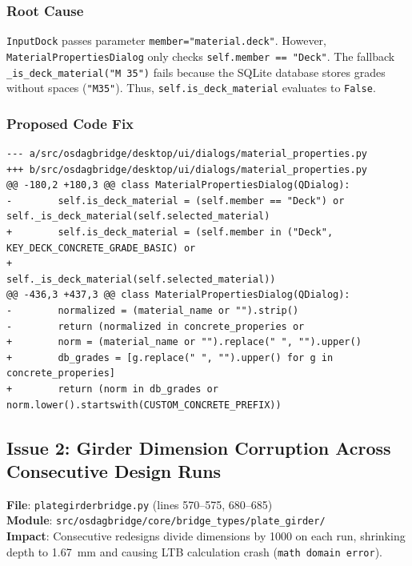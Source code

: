 \documentclass[11pt,a4paper]{article}
\begin{document}
\subsubsection*{Root Cause}
\texttt{InputDock} passes parameter \texttt{member="material.deck"}. However, \texttt{MaterialPropertiesDialog} only checks \texttt{self.member == "Deck"}. The fallback \texttt{\_is\_deck\_material("M 35")} fails because the SQLite database stores grades without spaces (\texttt{"M35"}). Thus, \texttt{self.is\_deck\_material} evaluates to \texttt{False}.

\subsubsection*{Proposed Code Fix}
\begin{lstlisting}
--- a/src/osdagbridge/desktop/ui/dialogs/material_properties.py
+++ b/src/osdagbridge/desktop/ui/dialogs/material_properties.py
@@ -180,2 +180,3 @@ class MaterialPropertiesDialog(QDialog):
-        self.is_deck_material = (self.member == "Deck") or self._is_deck_material(self.selected_material)
+        self.is_deck_material = (self.member in ("Deck", KEY_DECK_CONCRETE_GRADE_BASIC) or
+                                 self._is_deck_material(self.selected_material))
@@ -436,3 +437,3 @@ class MaterialPropertiesDialog(QDialog):
-        normalized = (material_name or "").strip()
-        return (normalized in concrete_properies or 
+        norm = (material_name or "").replace(" ", "").upper()
+        db_grades = [g.replace(" ", "").upper() for g in concrete_properies]
+        return (norm in db_grades or norm.lower().startswith(CUSTOM_CONCRETE_PREFIX))
\end{lstlisting}

\newpage
\subsection{Issue 2: Girder Dimension Corruption Across Consecutive Design Runs}
\begin{tcolorbox}[colback=red!5!white,colframe=red!75!black,title=\textbf{Bug Summary: Successive Unit Division Collapsing Section Geometry (Resolving Issue \#135)}]
\textbf{File}: \texttt{plategirderbridge.py} (lines 570--575, 680--685) \\
\textbf{Module}: \texttt{src/osdagbridge/core/bridge\_types/plate\_girder/} \\
\textbf{Impact}: Consecutive redesigns divide dimensions by 1000 on each run, shrinking depth to 1.67~mm and causing LTB calculation crash (\texttt{math domain error}).
\end{tcolorbox}
\end{document}
